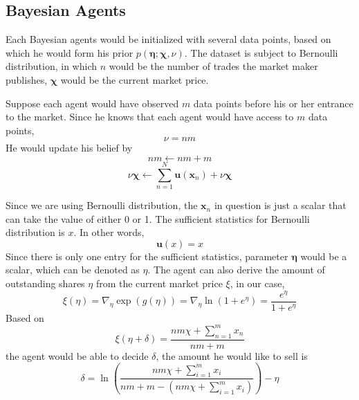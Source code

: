 \documentclass[12pt]{article}
\begin{document}
\subsection{Bayesian Agents}\label{Bayesian-agents}
Each Bayesian agents would be initialized with several data points, based on which he would form his prior $p(\boldsymbol{\eta}; \boldsymbol{\chi}, \nu)$. The dataset is subject to Bernoulli distribution, %
 in which $n$ would be the number of trades the market maker publishes, $\boldsymbol{\chi}$ would be the current market price.

Suppose each agent would have observed $m$ data points before his or her entrance to the market. Since he knows that each agent would have access to $m$ data points, $$\nu=nm$$ He would update his belief by %
$$nm \leftarrow n m+m$$ $$\nu\bm{\chi} \leftarrow \sum_{n=1}^{N} \mathbf{u}\left(\mathbf{x}_{n}\right)+\nu \bm{\chi}$$

Since we are using Bernoulli distribution, the $\mathbf{x}_n$ in question is just a scalar that can take the value of either 0 or 1. The sufficient statistics for Bernoulli distribution is $x$. In other words,
\begin{displaymath}
\mathbf{u}(x) = x
\end{displaymath}
Since there is only one entry for the sufficient statistics, parameter $\boldsymbol{\eta}$ would be a scalar, which can be denoted as $\eta$. 
The agent can also derive the amount of outstanding shares $\eta$ from the current market price $\xi$, in our case, 
\begin{equation}
    \xi(\eta) = \nabla_{\eta}\exp{(g(\eta))}=\nabla_{\eta}\ln \left(1+e^{\eta}\right)=\frac{e^{\eta}}{1+e^{\eta}}
\end{equation}
Based on %
$$\xi(\eta+\delta)=\frac{n m \chi+\sum_{n=1}^{m}x_n}{n m+m}$$ the agent would be able to decide $\delta$, the amount he would like to sell is
\begin{equation}
    \delta=\ln{(\frac{n m \chi+\sum_{i=1}^{m}x_i}{n m+m-(n m \chi+\sum_{i=1}^{m}x_i)})}-\eta
\end{equation}

\end{document}
